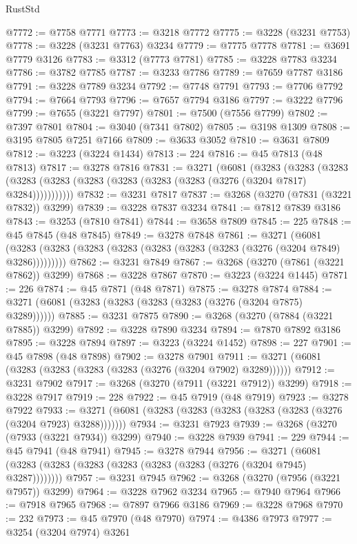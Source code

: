\begin{lexlean}{RustStd}
\begin{coremodule}
@7772 := @7758 @7771
@7773 := @3218 @7772
@7775 := @3228 (@3231 @7753)
@7778 := @3228 (@3231 @7763) @3234
@7779 := @7775 @7778
@7781 := @3691 @7779 @3126
@7783 := @3312 (@7773 @7781)
@7785 := @3228 @7783 @3234
@7786 := @3782 @7785
@7787 := @3233 @7786
@7789 := @7659 @7787 @3186
@7791 := @3228 @7789 @3234
@7792 := @7748 @7791
@7793 := @7706 @7792
@7794 := @7664 @7793
@7796 := @7657 @7794 @3186
@7797 := @3222 @7796
@7799 := @7655 (@3221 @7797)
@7801 := @7500 (@7556 @7799)
@7802 := @7397 @7801
@7804 := @3040 (@7341 @7802)
@7805 := @3198 @1309
@7808 := @3195 @7805 @7251 @7166
@7809 := @3633 @3052
@7810 := @3631 @7809
@7812 := @3223 (@3224 @1434)
@7813 := 224
@7816 := @45 @7813 (@48 @7813)
@7817 := @3278 @7816
@7831 := @3271
    (@6081
      (@3283
        (@3283
          (@3283 (@3283 (@3283 (@3283 (@3283 (@3283 (@3283 (@3276 (@3204 @7817) @3284)))))))))))
@7832 := @3231 @7817
@7837 := @3268 (@3270 (@7831 (@3221 @7832)) @3299)
@7839 := @3228 @7837 @3234
@7841 := @7812 @7839 @3186
@7843 := @3253 (@7810 @7841)
@7844 := @3658 @7809
@7845 := 225
@7848 := @45 @7845 (@48 @7845)
@7849 := @3278 @7848
@7861 := @3271
    (@6081 (@3283 (@3283 (@3283 (@3283 (@3283 (@3283 (@3283 (@3276 (@3204 @7849) @3286)))))))))
@7862 := @3231 @7849
@7867 := @3268 (@3270 (@7861 (@3221 @7862)) @3299)
@7868 := @3228 @7867
@7870 := @3223 (@3224 @1445)
@7871 := 226
@7874 := @45 @7871 (@48 @7871)
@7875 := @3278 @7874
@7884 := @3271 (@6081 (@3283 (@3283 (@3283 (@3283 (@3276 (@3204 @7875) @3289))))))
@7885 := @3231 @7875
@7890 := @3268 (@3270 (@7884 (@3221 @7885)) @3299)
@7892 := @3228 @7890 @3234
@7894 := @7870 @7892 @3186
@7895 := @3228 @7894
@7897 := @3223 (@3224 @1452)
@7898 := 227
@7901 := @45 @7898 (@48 @7898)
@7902 := @3278 @7901
@7911 := @3271 (@6081 (@3283 (@3283 (@3283 (@3283 (@3276 (@3204 @7902) @3289))))))
@7912 := @3231 @7902
@7917 := @3268 (@3270 (@7911 (@3221 @7912)) @3299)
@7918 := @3228 @7917
@7919 := 228
@7922 := @45 @7919 (@48 @7919)
@7923 := @3278 @7922
@7933 := @3271 (@6081 (@3283 (@3283 (@3283 (@3283 (@3283 (@3276 (@3204 @7923) @3288)))))))
@7934 := @3231 @7923
@7939 := @3268 (@3270 (@7933 (@3221 @7934)) @3299)
@7940 := @3228 @7939
@7941 := 229
@7944 := @45 @7941 (@48 @7941)
@7945 := @3278 @7944
@7956 := @3271 (@6081 (@3283 (@3283 (@3283 (@3283 (@3283 (@3283 (@3276 (@3204 @7945) @3287))))))))
@7957 := @3231 @7945
@7962 := @3268 (@3270 (@7956 (@3221 @7957)) @3299)
@7964 := @3228 @7962 @3234
@7965 := @7940 @7964
@7966 := @7918 @7965
@7968 := @7897 @7966 @3186
@7969 := @3228 @7968
@7970 := 232
@7973 := @45 @7970 (@48 @7970)
@7974 := @4386 @7973
@7977 := @3254 (@3204 @7974) @3261

\end{coremodule}
\end{lexlean}
